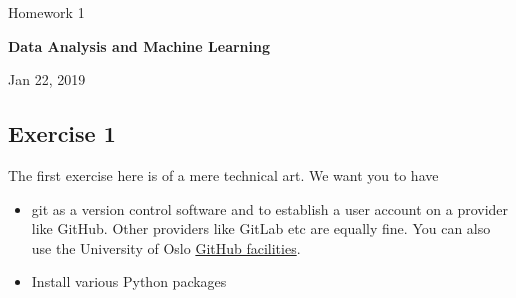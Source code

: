 \documentclass[%
oneside,                 %
final,                   %
10pt]{article}
\begin{document}

\newcommand{\exercisesection}[1]{\subsection*{#1}}






\thispagestyle{empty}

\begin{center}
{\LARGE\bf
\begin{spacing}{1.25}
Homework 1
\end{spacing}
}
\end{center}


\begin{center}
{\bf Data Analysis and Machine Learning${}^{}$} \\ [0mm]
\end{center}

\begin{center}
\end{center}
    

\begin{center}
Jan 22, 2019
\end{center}

\vspace{1cm}


\subsection{Exercise 1}

The first exercise here is of a mere technical art. We want you to have 
\begin{itemize}
\item git as a version control software and to establish a user account on a provider like GitHub. Other providers like GitLab etc are equally fine. You can also use the University of Oslo \href{{https://www.uio.no/tjenester/it/maskin/filer/versjonskontroll/github.html}}{GitHub facilities}. 

\item Install various Python packages
\end{itemize}
\end{document}
